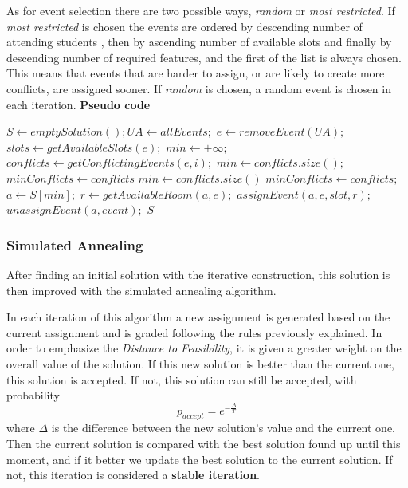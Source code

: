 \documentclass{llncs}
\begin{document}
As for event selection there are two possible ways, \textit{random} or \textit{most restricted}. If \textit{most restricted} is chosen the events are ordered by descending  number of attending students , then by ascending number of available slots and finally by descending number of required features, and the first of the list is always chosen. This means that events that are harder to assign, or are likely to create more conflicts, are assigned sooner. If \textit{random} is chosen, a random event is chosen in each iteration.
\newpage
\textbf{Pseudo code}
\begin{algorithmic}[1]
\State $S \leftarrow  emptySolution();UA \leftarrow  allEvents;$
	\State $e \leftarrow removeEvent(UA);$
	\State $slots \leftarrow  getAvailableSlots(e);$
	\State $min \gets +\infty;$
		\State $ conflicts \leftarrow getConflictingEvents(e,i);$
			\State $min \leftarrow conflicts.size();$
			\State $minConflicts \gets conflicts$
			\State $min \leftarrow conflicts.size()$
			\State $minConflicts \gets conflicts;$
		\EndIf
	\EndFor
	\State $a \gets S[min];$
	\State $r \gets getAvailableRoom(a,e);$
	\State $assignEvent(a,e,slot,r);$
		\State $ unassignEvent(a,event);$
	\EndFor
\EndWhile
\State \Return $S$	


\end{algorithmic}




\subsubsection{Simulated Annealing}

After finding an initial solution with the iterative construction, this solution is then improved with the simulated annealing algorithm. 

In each iteration of this algorithm a new assignment is generated based on the current assignment and is graded following the rules previously explained. In order to emphasize the \textit{Distance to Feasibility}, it is given a greater weight on the overall value of the solution. If this new solution is better than the current one, this solution is accepted. If not, this solution can still be accepted, with probability $$ p_{accept} = e^{-\frac{\Delta}{T}} $$ where $\Delta$ is the difference between the new solution's value and the current one. Then the current solution is compared with the best solution found up until this moment, and if it better we update the best solution to the current solution. If not, this iteration is considered a \textbf{stable iteration}.
\end{document}
